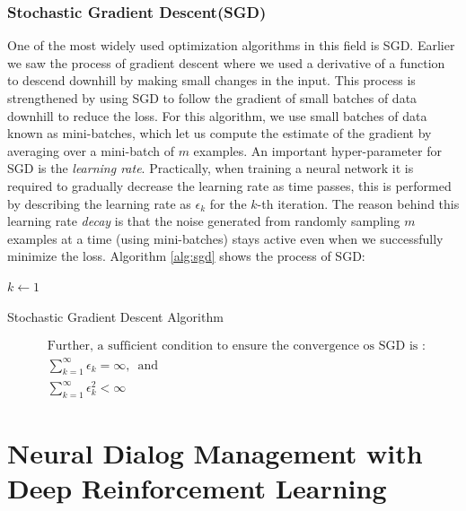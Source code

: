\documentclass[12pt]{extarticle}
\numberwithin{equation}{section}
\begin{document}
	\subsubsection{Stochastic Gradient Descent(SGD)}\label{sgd}
	One of the most widely used optimization algorithms in this field is SGD. Earlier we saw the process of gradient descent where we used a derivative of a function to descend downhill by making small changes in the input. This process is strengthened by using SGD to follow the gradient of small batches of data downhill to reduce the loss. For this algorithm, we use small batches of data known as mini-batches, which let us compute the estimate of the gradient by averaging over a mini-batch of $m$ examples. An important hyper-parameter for SGD is the \textit{learning rate}. Practically, when training a neural network it is required to gradually decrease the learning rate as time passes, this is performed by describing the learning rate as $\epsilon_k$ for the $k$-th iteration. The reason behind this learning rate \textit{decay} is that the noise generated from randomly sampling $m$ examples at a time (using mini-batches) stays active even when we successfully minimize the loss. Algorithm \ref{alg:sgd} shows the process of SGD: 
	\begin{algorithm}[t]
		\DontPrintSemicolon
		\SetAlgoLined
		$k \gets 1$\;
		\caption{Stochastic Gradient Descent Algorithm}\label{alg:sgd}
	\end{algorithm}
	
	\begin{align}
	&\text{Further, a sufficient condition to ensure the convergence os SGD is : }\nonumber\\
	&\sum_{k=1}^{\infty}\epsilon_k = \infty \text{,     {}{}    and}\\
	&\sum_{k=1}^{\infty}\epsilon_k^2 < \infty
	\end{align}
	\pagebreak
	
	\section[Neural Dialog Management]{Neural Dialog Management  with Deep Reinforcement Learning}\label{dm-with-drl}
\end{document}

